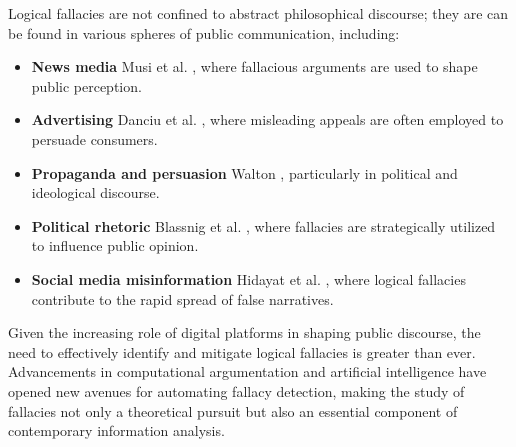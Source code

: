 
Logical fallacies are not confined to abstract philosophical discourse; they are can be found in various spheres of public communication, including:

\begin{itemize}
    \item \textbf{News media} Musi et al. \cite{musi2022fallacies}, where fallacious arguments are used to shape public perception.
    \item \textbf{Advertising} Danciu et al. \cite{danciu2014manipulative} , where misleading appeals are often employed to persuade consumers.
    \item \textbf{Propaganda and persuasion} Walton \cite{walton1997propaganda}, particularly in political and ideological discourse.
    \item \textbf{Political rhetoric} Blassnig et al. \cite{blassnig2019populism}, where fallacies are strategically utilized to influence public opinion.
    \item \textbf{Social media misinformation} Hidayat et al. \cite{hidayat2020logical}, where logical fallacies contribute to the rapid spread of false narratives.
\end{itemize}

Given the increasing role of digital platforms in shaping public discourse, the need to effectively identify and mitigate logical fallacies is greater than ever. Advancements in computational argumentation and artificial intelligence have opened new avenues for automating fallacy detection, making the study of fallacies not only a theoretical pursuit but also an essential component of contemporary information analysis.


